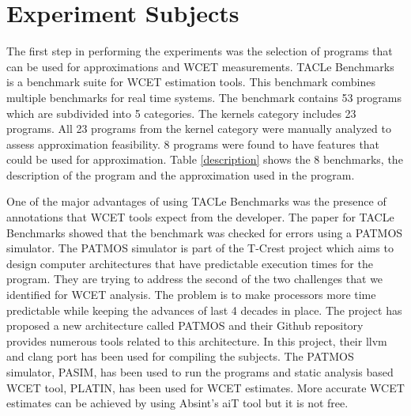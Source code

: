 \section{Experiment Subjects}
The first step in performing the experiments was the selection of programs that can be used for approximations and WCET measurements. TACLe Benchmarks \cite{Taclebench} is a benchmark suite for WCET estimation tools. This benchmark combines multiple benchmarks for real time systems. The benchmark contains 53 programs which are subdivided into 5 categories. The kernels category includes 23 programs. All 23 programs from the kernel category were manually analyzed to assess approximation feasibility. 8 programs were found to have features that could be used for approximation. Table \ref{description} shows the 8 benchmarks, the description of the program and the approximation used in the program.

One of the major advantages of using TACLe Benchmarks was the presence of annotations that WCET tools expect from the developer. The paper for TACLe Benchmarks showed that the benchmark was checked for errors using a PATMOS \cite{Patmos} simulator. The PATMOS simulator is part of the T-Crest project \cite{tcrest} which aims to design computer architectures that have predictable execution times for the program. They are trying to address the second of the two challenges that we identified for WCET analysis. The problem is to make processors more time predictable while keeping the advances of last 4 decades in place. The project has proposed a new architecture called PATMOS and their Github repository \cite{gtcrest}  provides numerous tools related to this architecture. In this project, their llvm and clang port has been used for compiling the subjects. The PATMOS simulator, PASIM, has been used to run the programs and static analysis based WCET tool, PLATIN, has been used for WCET estimates. More accurate WCET estimates can be achieved by using Absint's aiT tool but it is not free.

